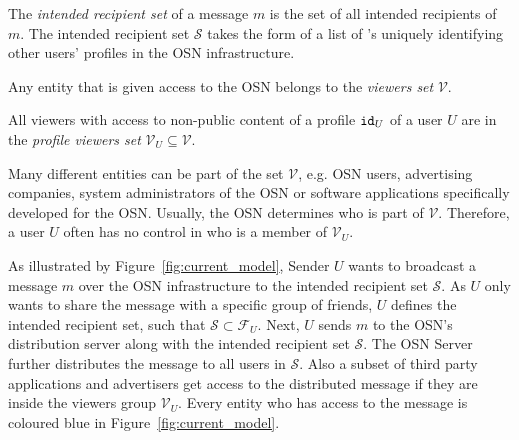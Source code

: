 \begin{defn}
\label{def:intended_recipient_set}
 The \textit{intended recipient set} of a message $m$ is the set of all intended recipients of $m$. The intended recipient set $\mathcal{S}$ takes the form of a list of \id{}'s uniquely identifying other users' profiles in the OSN infrastructure.
\end{defn}

\begin{defn}
\label{def:viewer}
 Any entity that is given access to the OSN belongs to the \textit{viewers set} $\mathcal{V}$.
\end{defn}

\begin{defn}
\label{def:viewer}
 All viewers with access to non-public content of a profile $\mathtt{id}_{U}$ of a user $U$ are in the \textit{profile viewers set} $\mathcal{V}_U \subseteq \mathcal{V}$.
\end{defn}

Many different entities can be part of the set $\mathcal{V}$, e.g. OSN users, advertising companies, system administrators of the OSN or software applications specifically developed for the OSN. Usually, the OSN determines who is part of $\mathcal{V}$. Therefore, a user $U$ often has no control in who is a member of $\mathcal{V}_U$.

As illustrated by Figure~\ref{fig:current_model}, Sender $U$ wants to broadcast a message $m$ over the OSN infrastructure to the intended recipient set $\mathcal{S}$. As $U$ only wants to share the message with a specific group of friends, $U$ defines the intended recipient set, such that $\mathcal{S} \subset \mathcal{F}_U$. Next, $U$ sends $m$ to the OSN's distribution server along with the intended recipient set $\mathcal{S}$. The OSN Server further distributes the message to all users in $\mathcal{S}$. Also a subset of third party applications and advertisers get access to the distributed message if they are inside the viewers group $\mathcal{V}_U$. Every entity who has access to the message is coloured blue in Figure~\ref{fig:current_model}.

